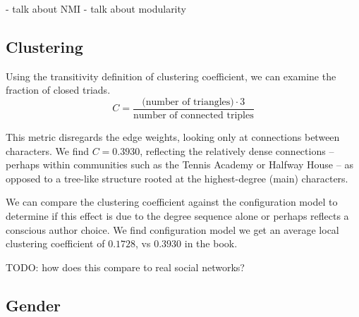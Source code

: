 - talk about NMI
- talk about modularity

\subsection{Clustering}
Using the transitivity definition of clustering coefficient, we can examine the fraction of closed triads.
$$ C = \frac{\text{(number of triangles)} \cdot 3}{\text{number of connected triples}} $$

This metric disregards the edge weights, looking only at connections between characters. We find $C = 0.3930$, reflecting the relatively dense connections -- perhaps within communities such as the Tennis Academy or Halfway House -- as opposed to a tree-like structure rooted at the highest-degree (main) characters.

We can compare the clustering coefficient against the configuration model to determine if this effect is due to the degree sequence alone or perhaps reflects a conscious author choice. We find configuration model we get an average local clustering coefficient of 0$.1728$, vs $0.3930$ in the book. 

TODO: how does this compare to real social networks?

\subsection{Gender}

